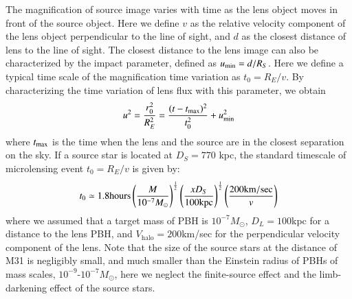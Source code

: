 \documentclass[iop, apj]{emulateapj}
\newcommand{\?}{\stackrel{?}{=}}
\begin{document}
The magnification of source image varies with time as the lens object moves in front of the source object. Here we define $v$ as the relative velocity component of the lens object perpendicular to the line of sight, and $d$ as the closest distance of lens to the line of sight. The closest distance to the lens image can also be characterized by the impact parameter, defined as $u_{\rm min}={d}/{R_S}$. 
Here we define a typical time scale of the magnification time variation as $t_0={R_E}/{v}$. 
By characterizing the time variation of lens flux with this parameter, we obtain 
%
%
%
\begin{eqnarray}
u^2=\frac{r^2_0}{R^2_E}=\frac{(t-t_{\rm max})^2}{t^2_0}+u^2_{\rm min}
\label{eq:cimpa}
\end{eqnarray}
%
where $t_{\rm max}$ is the time when the lens and the source are in the closest separation on the sky. 
%
%
%
%
If a source star is located at $D_S=770$ {kpc}, the standard 
timescale of microlensing event  $t_0={R_E}/{v}$ %
is given by: 
%
\begin{eqnarray}
t_0\simeq1.8{\rm hours} \left(\frac{M}{10^{-7}M_\odot}\right)^{\frac{1}{2}}\left(\frac{xD_S}{100 \rm{kpc}}\right)^{\frac{1}{2}} \left(\frac{200 {\rm km/sec}}{v}\right)
\end{eqnarray}
%
where we assumed that a target mass of PBH is $10^{-7}M_\odot$, $D_L=100$kpc for a distance to the lens PBH, and $V_\mathrm{halo}=200$km/sec for the perpendicular velocity component of the lens. 
Note that the size of the source stars at the distance of M31 is negligibly small, and 
much smaller than the Einstein radius of PBHs of mass scales, $10^{-9}$-$10^{-7}M_\odot$, 
here we neglect the finite-source effect and the limb-darkening effect of the source stars. 
\end{document}
